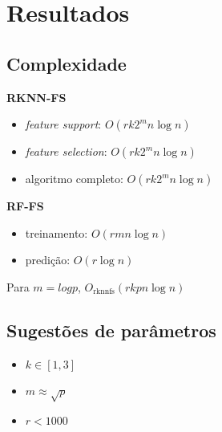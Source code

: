 \section{Resultados}

\subsection{Complexidade}
\begin{frame}
\textbf{RKNN-FS}
\begin{itemize}
    \item \textit{feature support}: $ O(rk2^mn\log{n}) $
    \item \textit{feature selection}: $ O(rk2^mn\log{n}) $
    \item algoritmo completo: $ O(rk2^mn\log{n}) $
\end{itemize}

\vspace{0.5cm}

\textbf{RF-FS}
\begin{itemize}
    \item treinamento: $ O(rmn\log{n}) $
    \item predição: $ O(r\log{n}) $
\end{itemize}

\vspace{0.5cm}

Para $ m = log{p} $, $ O_{\text{rknnfs}}(rkpn\log{n}) $

\end{frame}

\subsection{Sugestões de parâmetros}
\begin{frame}
\begin{itemize}
    \item $ k \in [1, 3] $
    \item $ m \approx \sqrt{p} $
    \item $ r < 1000 $
\end{itemize}
\end{frame}

